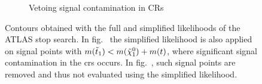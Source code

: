 \begin{figure}[H]
\begin{subfigure}[b]{0.47\textwidth}
		\caption{Vetoing signal contamination in CRs\label{fig:exclusion_stop1L_noLabel_v2_withoutCRs}}
	\end{subfigure}\hfill
	\caption{Contours obtained with the full and simplified likelihoods of the ATLAS stop search. In fig.~ the simplified likelihood is also applied on signal points with $m(\tilde{t}_1) < m(\tilde{\chi}_1^0)+m(t)$, where significant signal contamination in the \glspl{cr} occurs. In fig.~, such signal points are removed and thus not evaluated using the simplified likelihood.}\label{fig:limitations_simplied_stop1l}
\end{figure}


%
%


\FloatBarrier


